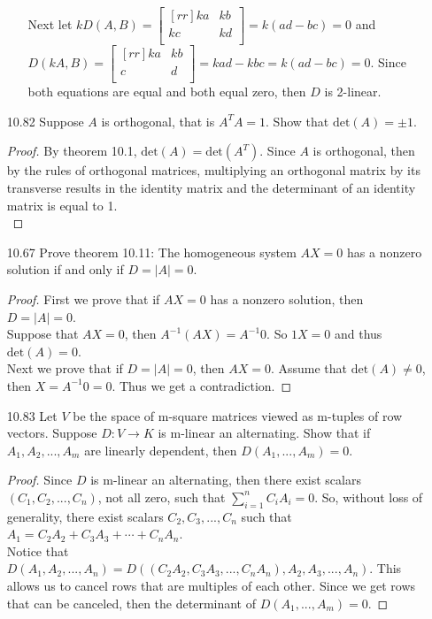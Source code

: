 \documentclass[12pt]{article}
\theoremstyle{definition}
\theoremstyle{plain}
\begin{document}
\begin{enumerate}
\begin{enumerate}
	Next let $kD(A,B)=\begin{bmatrix}[rr]ka&kb\\kc&kd\\\end{bmatrix}=k(ad-bc) = 0$ and $D(kA,B)=\begin{bmatrix}[rr]ka&kb\\c&d\\\end{bmatrix}=kad-kbc=k(ad-bc) = 0$. Since both equations are equal and both equal zero, then $D$ is 2-linear.
	\end{enumerate}
	
\item[10.82]Suppose $A$ is orthogonal, that is $A^TA=1$. Show that $\mathrm{det}(A)=\pm 1$.
	\begin{proof}
	By theorem 10.1, $\mathrm{det}(A) = \mathrm{det}(A^T)$. Since $A$ is orthogonal, then by the rules of orthogonal matrices, multiplying an orthogonal matrix by its transverse results in the identity matrix and the determinant of an identity matrix is equal to 1.\\
	\end{proof}
	
\item[10.67]Prove theorem 10.11: The homogeneous system $AX=0$ has a nonzero solution if and only if $D=|A|=0$.
	\begin{proof}
	First we prove that if $AX=0$ has a nonzero solution, then $D=|A|=0$.\\
	Suppose that $AX=0$, then $A^{-1}(AX)=A^{-1}0$. So $1X=0$ and thus $\mathrm{det}(A)=0$.\\
	Next we prove that if $D=|A|=0$, then $AX=0$. Assume that $\mathrm{det}(A)\neq 0$, then $X=A^{-1}0 = 0$. Thus we get a contradiction.
	\end{proof}

\item[10.83]Let $V$ be the space of m-square matrices viewed as m-tuples of row vectors. Suppose $D:V \rightarrow K$ is m-linear an alternating. Show that if $A_1,A_2,...,A_m$ are linearly dependent, then $D(A_1,...,A_m)=0$.
\begin{proof}
	Since $D$ is m-linear an alternating, then there exist scalars $(C_1,C_2,...,C_n)$, not all zero, such that $\sum_{i=1}^nC_iA_i=0$. So, without loss of generality, there exist scalars $C_2,C_3,...,C_n$ such that $A_1=C_2A_2+C_3A_3+\cdots+C_nA_n$.\\
	Notice that $D(A_1,A_2,...,A_n)=D((C_2A_2,C_3A_3,...,C_nA_n),A_2,A_3,...,A_n)$. This allows us to cancel rows that are multiples of each other. Since we get rows that can be canceled, then the determinant of $D(A_1,...,A_m)=0$.
\end{proof}
\end{enumerate}
\end{document}
